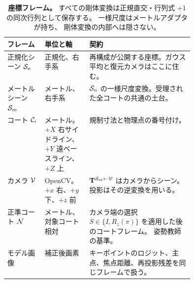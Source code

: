 \begin{table}[t]
  \centering
  \caption{\textbf{座標フレーム。}
  すべての剛体変換は正規直交・行列式 \(+1\) の同次行列として保存する。
  一様尺度はメートルアダプタが持ち、
  剛体変換の内部へは隠さない。
  }
  \label{tab:frames}
  \small
  \begin{tabularx}{\linewidth}{@{}p{0.20\linewidth}p{0.24\linewidth}X@{}}
    \toprule
    フレーム & 単位と軸 & 契約 \\
    \midrule
    正規化シーン \(\mathcal{S}_n\) & 正規化、右手系 &
      再構成が公開する座標。ガウス平均と復元カメラはここに住む。 \\
    メートルシーン \(\mathcal{S}_m\) & メートル、右手系 &
      \(\mathcal{S}_n\) の一様尺度変換。受理された全コートの共通の土台。 \\
    コート \(\mathcal{C}_i\) & メートル。\(+X\) 右サイドライン、
      \(+Y\) 遠ベースライン、\(+Z\) 上 &
      規制寸法と物理点の番号付け。 \\
    カメラ \(\mathcal{V}\) & OpenCV。\(+x\) 右、\(+y\) 下、\(+z\) 前 &
      \(\mathbf{T}^{\mathcal{S}_m\leftarrow \mathcal{V}}\) はカメラからシーン。
      投影はその逆変換を用いる。 \\
    正準コート \(\mathcal{N}\) & メートル、対象コート相対 &
      カメラ端の選択 \(S\in\{I,R_z(\pi)\}\) を適用した後のコートフレーム。
      姿勢教師の基準。 \\
    モデル画像 & 補正後画素 &
      キーポイントのロジット、主点、焦点距離、再投影残差を同じフレームで扱う。 \\
    \bottomrule
  \end{tabularx}
\end{table}
